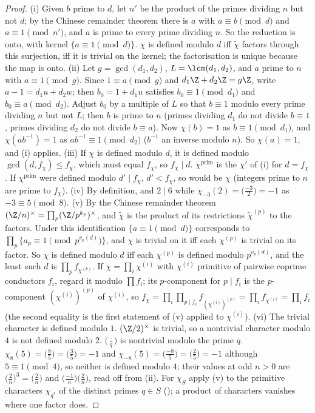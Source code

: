 \begin{proof}
(i) Given $b$ prime to $d$, let $n'$ be the product of the primes dividing $n$ but not $d$; by the Chinese remainder theorem there is $a$ with
$a\equiv b\pmod d$ and $a\equiv1\pmod{n'}$, and $a$ is prime to every prime dividing $n$. So the reduction is onto, with kernel
$\{a\equiv1\pmod d\}$. $\chi$ is defined modulo $d$ iff $\tilde\chi$ factors through this surjection, iff it is trivial on the kernel; the factorisation
is unique because the map is onto.
(ii) Let $g=\gcd(d_1,d_2)$, $L=\lcm(d_1,d_2)$, and $a$ prime to $n$ with $a\equiv1\pmod g$. Since $1\equiv a\pmod g$ and $d_1\Z+d_2\Z=g\Z$, write $a-1=d_1u+d_2w$; then
$b_0=1+d_1u$ satisfies $b_0\equiv1\pmod{d_1}$ and $b_0\equiv a\pmod{d_2}$. Adjust $b_0$ by a multiple of $L$ so that $b\equiv1$ modulo every prime dividing $n$ but not
$L$; then $b$ is prime to $n$ (primes dividing $d_1$ do not divide $b\equiv1$, primes dividing $d_2$ do not divide $b\equiv a$). Now $\chi(b)=1$ as
$b\equiv1\pmod{d_1}$, and $\chi(ab^{-1})=1$ as $ab^{-1}\equiv1\pmod{d_2}$ ($b^{-1}$ an inverse modulo $n$). So $\chi(a)=1$, and (i) applies.
(iii) If $\chi$ is defined modulo $d$, it is defined modulo $\gcd(d,f_\chi)\le f_\chi$, which must equal $f_\chi$, so $f_\chi\mid d$. $\chi^{\mathrm{prim}}$ is the $\chi'$ of (i)
for $d=f_\chi$. If $\chi^{\mathrm{prim}}$ were defined modulo $d'\mid f_\chi$, $d'<f_\chi$, so would be $\chi$ (integers prime to $n$ are prime to $f_\chi$).
(iv) By definition, and $2\mid6$ while $\chi_{-3}(2)=\bigl(\frac{-3}2\bigr)=-1$ as $-3\equiv5\pmod8$.
(v) By the Chinese remainder theorem $(\Z/n)^\times=\prod_p(\Z/p^{k_p})^\times$, and $\tilde\chi$ is the product of its restrictions $\tilde\chi^{(p)}$ to the factors.
Under this identification $\{a\equiv1\pmod d\}$ corresponds to $\prod_p\{a_p\equiv1\pmod{p^{v_p(d)}}\}$, and $\chi$ is trivial on it iff each $\chi^{(p)}$ is trivial
on its factor. So $\chi$ is defined modulo $d$ iff each $\chi^{(p)}$ is defined modulo $p^{v_p(d)}$, and the least such $d$ is $\prod_pf_{\chi^{(p)}}$. If
$\chi=\prod_i\chi^{(i)}$ with $\chi^{(i)}$ primitive of pairwise coprime conductors $f_i$, regard it modulo $\prod f_i$; its $p$-component for $p\mid f_i$ is
the $p$-component $(\chi^{(i)})^{(p)}$ of $\chi^{(i)}$, so $f_\chi=\prod_i\prod_{p\mid f_i}f_{(\chi^{(i)})^{(p)}}=\prod_if_{\chi^{(i)}}=\prod_if_i$ (the second equality is the
first statement of (v) applied to $\chi^{(i)}$).
(vi) The trivial character is defined modulo $1$. $(\Z/2)^\times$ is trivial, so a nontrivial character modulo $4$ is not defined modulo $2$.
$\bigl(\frac\cdot q\bigr)$ is nontrivial modulo the prime $q$. $\chi_8(5)=\bigl(\frac85\bigr)=\bigl(\frac35\bigr)=-1$ and $\chi_{-8}(5)=\bigl(\frac{-8}5\bigr)=\bigl(\frac25\bigr)=-1$ although $5\equiv1\pmod4$, so neither is
defined modulo $4$; their values at odd $n>0$ are $\bigl(\frac2n\bigr)^3=\bigl(\frac2n\bigr)$ and $\bigl(\frac{-1}n\bigr)\bigl(\frac2n\bigr)$, read off from (ii). For $\chi_S$ apply (v) to the primitive
characters $\chi_{q^*}$ of the distinct primes $q\in S$ (); a product of characters vanishes where one factor does.
\end{proof}

